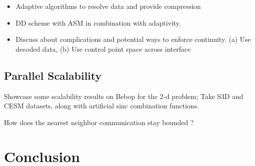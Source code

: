 \documentclass[conference]{IEEEtran}
\begin{document}
\begin{itemize}
	\item Adaptive algorithms to resolve data and provide compression
	\item DD scheme with ASM in combination with adaptivity.
	\item Discuss about complications and potential ways to enforce continuity. (a) Use decoded data, (b) Use control point space across interface
\end{itemize}

\subsection{Parallel Scalability}\label{SCM}

Showcase some scalability results on Bebop for the 2-d problem; Take S3D and CESM datasets, along with artificial sinc combination functions.

How does the nearest neighbor communication stay bounded ?




\section{Conclusion}
\end{document}
